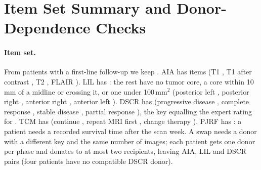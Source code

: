 \documentclass[11pt]{article}
\begin{document}



\section{Item Set Summary and Donor-Dependence Checks}
\label{sec:app-summary}

\paragraph{Item set.} From \vfourCandPatients{} patients with a first-line follow-up we keep \vfourPatients{}. AIA has \vfourNAIA{} items (T1 \vfourAiaCountTOne{}, T1 after contrast \vfourAiaCountTOneC{}, T2 \vfourAiaCountTTwo{}, FLAIR \vfourAiaCountFlair{}). LIL has \vfourNLIL{}: the rest have no tumor core, a core within 10\,mm of a midline or crossing it, or one under 100\,mm$^2$ (posterior left \vfourLilCountLP{}, posterior right \vfourLilCountRP{}, anterior right \vfourLilCountRA{}, anterior left \vfourLilCountLA{}). DSCR has \vfourNDSCR{} (progressive disease \vfourDscrCountPD{}, complete response \vfourDscrCountCR{}, stable disease \vfourDscrCountSD{}, partial response \vfourDscrCountPR{}), the key equalling the expert rating for \vfourSelExpertAgrees{}. TCM has \vfourNTCM{} (continue \vfourTcmContinue{}, repeat MRI first \vfourTcmConfirm{}, change therapy \vfourTcmEscalate{}). PJRF has \vfourNPJRF{}: a patient needs a recorded survival time after the scan week. A swap needs a donor with a different key and the same number of images; each patient gets one donor per phase and donates to at most two recipients, leaving \vfourPairsAIA{} AIA, \vfourPairsLIL{} LIL and \vfourPairsDSCR{} DSCR pairs (four patients have no compatible DSCR donor).

\begin{table}[t]
\centering
\footnotesize
\setlength{\tabcolsep}{5pt}

\caption{DSCR class-wise confusion for Llama-4-Scout with its own image (rows: the item's RANO key class; columns: the model's predicted class; recall on the diagonal). Overall accuracy \vfourConfScoutAcc{}\% is below the majority share (\vfourConfScoutMajority{}\%), but the model is not a constant predictor: it recovers \vfourConfOffMajority{} of \vfourConfOffMajorityN{} non-majority items while missing some progressive-disease items, so below-majority accuracy is not evidence that the slice is unread.}
\label{tab:confusion}
\end{table}
\end{document}
